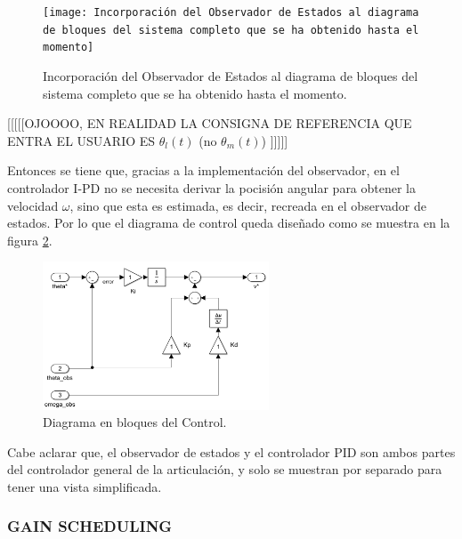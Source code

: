 \documentclass{article}
\begin{document}
\begin{sloppypar}
\begin{figure}[H]
    \centering
    \texttt{[image: Incorporación del Observador de Estados al diagrama de bloques del sistema completo que se ha obtenido hasta el momento]}
    \caption{Incorporación del Observador de Estados al diagrama de bloques del sistema completo que se ha obtenido hasta el momento.}
    \label{fig:Incorporación del Observador de Estados al diagrama de bloques del sistema completo que se ha obtenido hasta el momento}
\end{figure}
[[[[[OJOOOO, EN REALIDAD LA CONSIGNA DE REFERENCIA QUE ENTRA EL USUARIO ES $\theta_l(t)$ (no $\theta_m(t)$) ]]]]]

Entonces se tiene que, gracias a la implementación del observador, en el controlador I-PD no se necesita derivar la pocisión angular para obtener la velocidad $\omega$, sino que esta es estimada, es decir, recreada en el observador de estados. Por lo que el diagrama de control queda diseñado como se muestra en la figura \ref{fig:Diagrama en bloques del Control}.

\begin{figure}[H]
    \centering
    \includegraphics[width=0.60\textwidth]{Diagrama en bloques del Control}
    \caption{Diagrama en bloques del Control.}
    \label{fig:Diagrama en bloques del Control}
\end{figure}

Cabe aclarar que, el observador de estados y el controlador PID son ambos partes del controlador general de la articulación, y solo se muestran por separado para tener una vista simplificada.





\subsubsection{GAIN SCHEDULING}
\label{sec:GAIN SCHEDULING}


\end{sloppypar}
\end{document}
